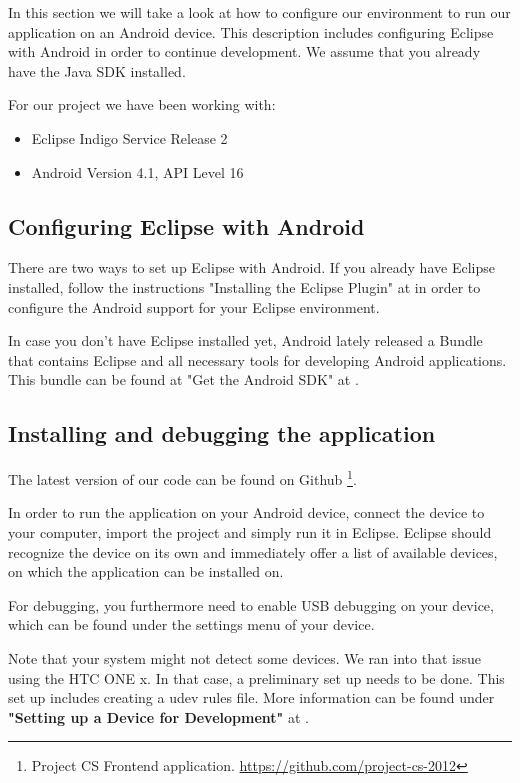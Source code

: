 In this section we will take a look at how to configure
our environment to run our application on an Android device. 
This description includes configuring Eclipse with Android in order to continue development. 
We assume that you already have the Java SDK installed.

For our project we have been working with:
\begin{itemize}
\item Eclipse Indigo Service Release 2
\item Android Version 4.1, API Level 16
\end{itemize}

\subsection{Configuring Eclipse with Android}
There are two ways to set up Eclipse with Android.
If you already have Eclipse installed, follow
the instructions "Installing the Eclipse Plugin" 
at \cite{android} in order to configure the 
Android support for your Eclipse environment.

In case you don't have Eclipse installed yet, Android
lately released a Bundle that contains Eclipse and all 
necessary tools for developing Android applications.
This bundle can be found at "Get the Android SDK" at \cite{android}.

\subsection{Installing and debugging the application}
The latest version of our code can be found on Github \footnote{Project CS Frontend application. \url{https://github.com/project-cs-2012}}.

In order to run the application on your Android device, connect the device
to your computer, import the project and simply run it in Eclipse. 
Eclipse should recognize the device on its own and immediately offer a list
of available devices, on which the application can be installed on.

For debugging, you furthermore need to enable USB debugging on your device,
which can be found under the settings menu of your device.

Note that your system might not detect some devices. We ran into that issue
using the HTC ONE x. In that case, a preliminary set up needs to be done.
This set up includes creating a udev rules file. More information
can be found under \textbf{"Setting up a Device for Development"} at
\cite{android}.



